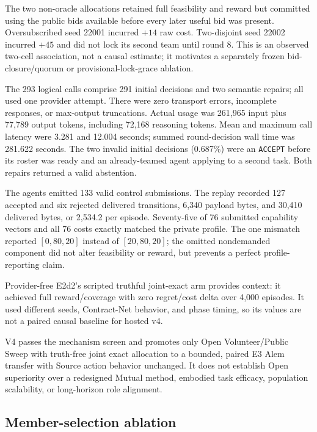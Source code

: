 \documentclass[11pt]{article}
\newcommand{\code}[1]{\texttt{#1}}
\begin{document}
The two non-oracle allocations retained full feasibility and reward but
committed using the public bids available before every later useful bid was
present.  Oversubscribed seed 22001 incurred $+14$ raw cost.  Two-disjoint
seed 22002 incurred $+45$ and did not lock its second team until round 8.
This is an observed two-cell association, not a causal estimate; it motivates
a separately frozen bid-closure/quorum or provisional-lock-grace ablation.

The 293 logical calls comprise 291 initial decisions and two semantic repairs;
all used one provider attempt.  There were zero transport errors, incomplete
responses, or max-output truncations.  Actual usage was 261,965 input plus
77,789 output tokens, including 72,168 reasoning tokens.  Mean and maximum
call latency were 3.281 and 12.004 seconds; summed round-decision wall time was
281.622 seconds.  The two invalid initial decisions (0.687\%) were an
\code{ACCEPT} before its roster was ready and an already-teamed agent applying
to a second task.  Both repairs returned a valid abstention.

The agents emitted 133 valid control submissions.  The replay recorded 127
accepted and six rejected delivered transitions, 6,340 payload bytes, and
30,410 delivered bytes, or 2,534.2 per episode.  Seventy-five of 76 submitted
capability vectors and all 76 costs exactly matched the private profile.  The
one mismatch reported $[0,80,20]$ instead of $[20,80,20]$; the omitted
nondemanded component did not alter feasibility or reward, but prevents a
perfect profile-reporting claim.

Provider-free E2d2's scripted truthful joint-exact arm provides context: it
achieved full reward/coverage with zero regret/cost delta over 4,000 episodes.
It used different seeds, Contract-Net behavior, and phase timing, so its
values are not a paired causal baseline for hosted v4.

V4 passes the mechanism screen and promotes only Open Volunteer/Public Sweep
with truth-free joint exact allocation to a bounded, paired E3 Alem transfer
with Source action behavior unchanged.  It does not establish Open superiority
over a redesigned Mutual method, embodied task efficacy, population
scalability, or long-horizon role alignment.

\subsection{Member-selection ablation}
\end{document}
